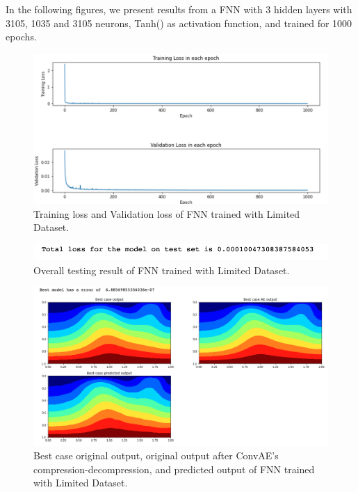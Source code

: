 In the following figures, we present results from a FNN with 3 hidden layers with 3105, 1035 and 3105 neurons, Tanh() as activation function, and trained for 1000 epochs.

\begin{figure}[H]
    \caption{Training loss and Validation loss of FNN trained with Limited Dataset.}
    \includegraphics[scale=0.6]{figures/mantle_convection_images/limited_dataset/FNN_trainingData.png}
\end{figure}

\begin{figure}[H]
    \caption{Overall testing result of FNN trained with Limited Dataset.}
    \includegraphics[scale=0.8]{figures/mantle_convection_images/limited_dataset/FNN_OverallTesting.png}
\end{figure}

\begin{figure}[H]
    \caption{Best case original output, original output after ConvAE's compression-decompression, and predicted output of FNN trained with Limited Dataset.}
    \includegraphics[scale=0.5]{figures/mantle_convection_images/limited_dataset/FNN_Best.png}
\end{figure}

